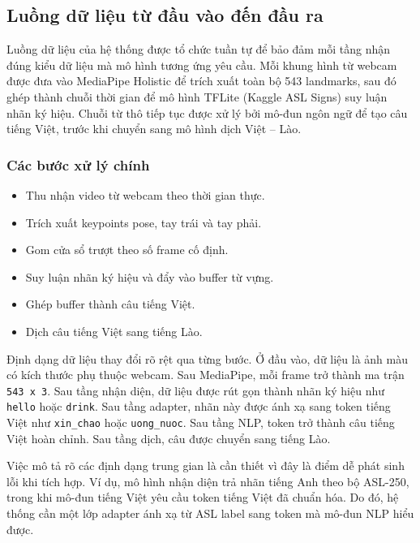 ﻿\subsection{Luồng dữ liệu từ đầu vào đến đầu ra}

Luồng dữ liệu của hệ thống được tổ chức tuần tự để bảo đảm mỗi tầng nhận đúng kiểu dữ liệu mà mô hình tương ứng yêu cầu. Mỗi khung hình từ webcam được đưa vào MediaPipe Holistic để trích xuất toàn bộ 543 landmarks, sau đó ghép thành chuỗi thời gian để mô hình TFLite (Kaggle ASL Signs) suy luận nhãn ký hiệu. Chuỗi từ thô tiếp tục được xử lý bởi mô-đun ngôn ngữ để tạo câu tiếng Việt, trước khi chuyển sang mô hình dịch Việt -- Lào.

\subsubsection{Các bước xử lý chính}
\begin{itemize}
    \item Thu nhận video từ webcam theo thời gian thực.
    \item Trích xuất keypoints pose, tay trái và tay phải.
    \item Gom cửa sổ trượt theo số frame cố định.
    \item Suy luận nhãn ký hiệu và đẩy vào buffer từ vựng.
    \item Ghép buffer thành câu tiếng Việt.
    \item Dịch câu tiếng Việt sang tiếng Lào.
\end{itemize}

Định dạng dữ liệu thay đổi rõ rệt qua từng bước. Ở đầu vào, dữ liệu là ảnh màu có kích thước phụ thuộc webcam. Sau MediaPipe, mỗi frame trở thành ma trận \texttt{543 x 3}. Sau tầng nhận diện, dữ liệu được rút gọn thành nhãn ký hiệu như \texttt{hello} hoặc \texttt{drink}. Sau tầng adapter, nhãn này được ánh xạ sang token tiếng Việt như \texttt{xin\_chao} hoặc \texttt{uong\_nuoc}. Sau tầng NLP, token trở thành câu tiếng Việt hoàn chỉnh. Sau tầng dịch, câu được chuyển sang tiếng Lào.

Việc mô tả rõ các định dạng trung gian là cần thiết vì đây là điểm dễ phát sinh lỗi khi tích hợp. Ví dụ, mô hình nhận diện trả nhãn tiếng Anh theo bộ ASL-250, trong khi mô-đun tiếng Việt yêu cầu token tiếng Việt đã chuẩn hóa. Do đó, hệ thống cần một lớp adapter ánh xạ từ ASL label sang token mà mô-đun NLP hiểu được.

